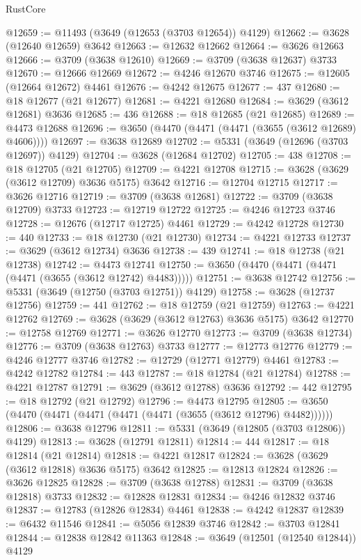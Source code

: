 \begin{lexlean}{RustCore}
\begin{coremodule}
@12659 := @11493 (@3649 (@12653 (@3703 @12654)) @4129)
@12662 := @3628 (@12640 @12659) @3642
@12663 := @12632 @12662
@12664 := @3626 @12663
@12666 := @3709 (@3638 @12610)
@12669 := @3709 (@3638 @12637) @3733
@12670 := @12666 @12669
@12672 := @4246 @12670 @3746
@12675 := @12605 (@12664 @12672) @4461
@12676 := @4242 @12675
@12677 := 437
@12680 := @18 @12677 (@21 @12677)
@12681 := @4221 @12680
@12684 := @3629 (@3612 @12681) @3636
@12685 := 436
@12688 := @18 @12685 (@21 @12685)
@12689 := @4473 @12688
@12696 := @3650 (@4470 (@4471 (@4471 (@3655 (@3612 @12689) @4606))))
@12697 := @3638 @12689
@12702 := @5331 (@3649 (@12696 (@3703 @12697)) @4129)
@12704 := @3628 (@12684 @12702)
@12705 := 438
@12708 := @18 @12705 (@21 @12705)
@12709 := @4221 @12708
@12715 := @3628 (@3629 (@3612 @12709) @3636 @5175) @3642
@12716 := @12704 @12715
@12717 := @3626 @12716
@12719 := @3709 (@3638 @12681)
@12722 := @3709 (@3638 @12709) @3733
@12723 := @12719 @12722
@12725 := @4246 @12723 @3746
@12728 := @12676 (@12717 @12725) @4461
@12729 := @4242 @12728
@12730 := 440
@12733 := @18 @12730 (@21 @12730)
@12734 := @4221 @12733
@12737 := @3629 (@3612 @12734) @3636
@12738 := 439
@12741 := @18 @12738 (@21 @12738)
@12742 := @4473 @12741
@12750 := @3650 (@4470 (@4471 (@4471 (@4471 (@3655 (@3612 @12742) @4483)))))
@12751 := @3638 @12742
@12756 := @5331 (@3649 (@12750 (@3703 @12751)) @4129)
@12758 := @3628 (@12737 @12756)
@12759 := 441
@12762 := @18 @12759 (@21 @12759)
@12763 := @4221 @12762
@12769 := @3628 (@3629 (@3612 @12763) @3636 @5175) @3642
@12770 := @12758 @12769
@12771 := @3626 @12770
@12773 := @3709 (@3638 @12734)
@12776 := @3709 (@3638 @12763) @3733
@12777 := @12773 @12776
@12779 := @4246 @12777 @3746
@12782 := @12729 (@12771 @12779) @4461
@12783 := @4242 @12782
@12784 := 443
@12787 := @18 @12784 (@21 @12784)
@12788 := @4221 @12787
@12791 := @3629 (@3612 @12788) @3636
@12792 := 442
@12795 := @18 @12792 (@21 @12792)
@12796 := @4473 @12795
@12805 := @3650 (@4470 (@4471 (@4471 (@4471 (@4471 (@3655 (@3612 @12796) @4482))))))
@12806 := @3638 @12796
@12811 := @5331 (@3649 (@12805 (@3703 @12806)) @4129)
@12813 := @3628 (@12791 @12811)
@12814 := 444
@12817 := @18 @12814 (@21 @12814)
@12818 := @4221 @12817
@12824 := @3628 (@3629 (@3612 @12818) @3636 @5175) @3642
@12825 := @12813 @12824
@12826 := @3626 @12825
@12828 := @3709 (@3638 @12788)
@12831 := @3709 (@3638 @12818) @3733
@12832 := @12828 @12831
@12834 := @4246 @12832 @3746
@12837 := @12783 (@12826 @12834) @4461
@12838 := @4242 @12837
@12839 := @6432 @11546
@12841 := @5056 @12839 @3746
@12842 := @3703 @12841
@12844 := @12838 @12842 @11363
@12848 := @3649 (@12501 (@12540 @12844)) @4129

\end{coremodule}
\end{lexlean}
